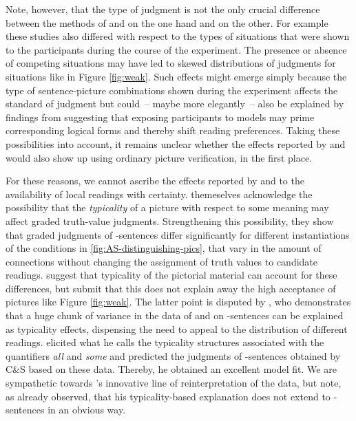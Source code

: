 \documentclass[fleqn,reqno,10pt,draft]{article}
\newcommand{\as}{\acro{as}}
\renewcommand{\es}{\acro{es}}
\begin{document}
Note, however, that the type of judgment  is not the only crucial difference between the methods of \citeauthor{CliftonDube2010:Embedded-Implic} and \citeauthor{ChemlaSpector2010:Experimental-Ev} on the one hand and  \citet{GeurtsPouscoulous2009:Embedded-Implic} on the other. For example these studies  also differed with respect to the types of situations that were shown to the participants during the course of the experiment.  The presence or absence of competing situations may have led to skewed distributions of judgments for situations like in Figure \ref{fig:weak}. Such effects might emerge simply because the type of sentence-picture combinations shown during the experiment affects the standard of judgment but could~-- maybe more elegantly~-- also be explained by findings from \citet{Raffray2010} suggesting that exposing participants to models may prime corresponding logical forms and thereby shift reading preferences. Taking these possibilities into account, it remains unclear whether the effects reported by  \citeauthor{CliftonDube2010:Embedded-Implic} and \citeauthor{ChemlaSpector2010:Experimental-Ev} would also show up using ordinary picture verification, in the first place.   

For these reasons, we cannot ascribe the effects reported by  \citeauthor{CliftonDube2010:Embedded-Implic} and \citeauthor{ChemlaSpector2010:Experimental-Ev} to the availability of local readings with certainty. \citet{ChemlaSpector2010:Experimental-Ev} themeselves acknowledge
the possibility that the \emph{typicality} of a picture with respect to some meaning may affect graded truth-value
judgments. Strengthening this possibility, they show that graded judgments of
\as-sentences differ significantly for different instantiations of the
conditions in \ref{fig:AS-distinguishing-pics}, that vary in the
amount of connections without changing the assignment of truth values
to candidate readings. \citeauthor{ChemlaSpector2010:Experimental-Ev}
suggest that typicality of the pictorial material can account for
these differences, but submit that this does not explain away the
high acceptance of pictures like Figure \ref{fig:weak}. The latter point is disputed by
\citet{Tielvan-Tiel2012:Embedded-Scalar}, who demonstrates that a huge chunk of variance in the data of
\citeauthor{CliftonDube2010:Embedded-Implic} and \citeauthor{ChemlaSpector2010:Experimental-Ev} on
\as-sentences can be explained as typicality effects, dispensing the need to appeal
to the distribution of different readings. \citet{Tielvan-Tiel2012:Embedded-Scalar} elicited what he calls the typicality
structures associated with the quantifiers {\it all} and {\it some} and predicted the judgments of \as-sentences obtained by C\&S based
on these data. Thereby, he obtained an excellent model fit. We are sympathetic towards
\citeauthor{Tielvan-Tiel2012:Embedded-Scalar}'s innovative line of
reinterpretation of the data, but note, as
\citet{ChemlaSpector2010:Experimental-Ev} already observed, that his
typicality-based explanation does not extend to \es-sentences in an
obvious way.
\end{document}
